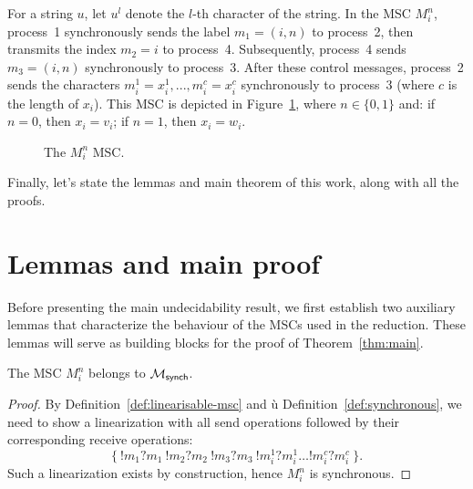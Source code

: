 \bigskip

\begin{definition}[$M^n_i$]\label{def:mni}
	For a string $u$, let $u^l$ denote the $l$-th character of the string.
	In the MSC $M^n_i$, process~1 synchronously sends the label
	$m_1 = (i, n)$ to process~2, then transmits the index $m_2=i$
	to process~4. Subsequently, process~4 sends $m_3 = (i, n)$
	synchronously to process~3. After these control messages, process~2
	sends the characters $m_i^1 = x_i^1,..., m_i^c = x_i^c$
	synchronously to process~3 (where $c$ is the length of $x_i$).
	This MSC is depicted in Figure~\ref{fig:mni}, where $n\in\{0,1\}$ and:
	if $n=0$, then $x_i=v_i$; if $n=1$, then $x_i=w_i$.

	\begin{figure}[!ht]
		\centering
		\begin{msc}[draw frame=none, draw head=none, msc keyword=, head height=0px, label distance=0.5ex, foot height=0px, foot distance=0px]{}

		\end{msc}
		\caption{The $M_i^n$ MSC.}
		\label{fig:mni}
	\end{figure}

\end{definition}

Finally, let's state the lemmas and main theorem of this work, 
along with all the proofs. 

\section{Lemmas and main proof}

Before presenting the main undecidability result, we first establish two
auxiliary lemmas that characterize the behaviour of the MSCs used in the
reduction. These lemmas will serve as building blocks for the proof of
Theorem~\ref{thm:main}.

\bigskip

\begin{lemma}\label{lemma:minsynch}
	The MSC $M_i^n$ belongs to $\mathcal{M}_{\mathsf{synch}}$.
\end{lemma}

\begin{proof}
	By Definition~\ref{def:linearisable-msc} and ù
	Definition~\ref{def:synchronous},
	we need to show a linearization with all send operations
	followed by their corresponding receive operations:
	$$
		\{~!m_1?m_1\ !m_2?m_2\ !m_3?m_3\ !m_i^1?m_i^1 \ldots !m_i^c?m_i^c~\}.
	$$
	Such a linearization exists by construction, hence $M_i^n$ is synchronous.
\end{proof}

